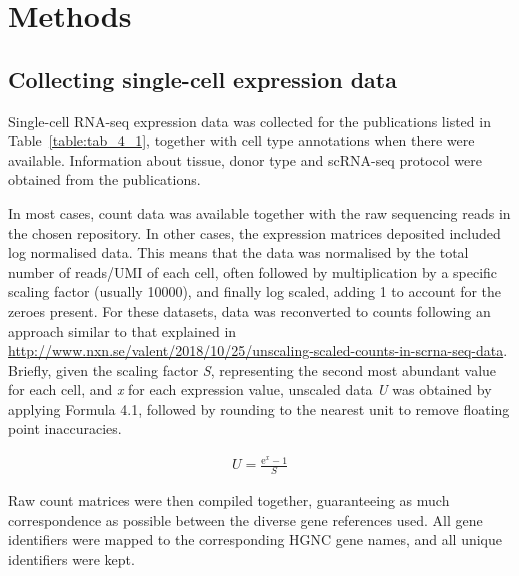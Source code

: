 




\section{Methods}
\label{section4.4}
\subsection{Collecting single-cell expression data}
\label{section4.4_datacol}
Single-cell RNA-seq expression data was collected for the publications listed in Table~\ref{table:tab_4_1}, together with cell type annotations when there were available. Information about tissue, donor type and scRNA-seq protocol were obtained from the publications.

In most cases, count data was available together with the raw sequencing reads in the chosen repository. In other cases, the expression matrices deposited included log normalised data. This means that the data was normalised by the total number of reads/UMI of each cell, often followed by multiplication by a specific scaling factor (usually 10000), and finally log scaled, adding 1 to account for the zeroes present. For these datasets, data was reconverted to counts following an approach similar to that explained in \url{http://www.nxn.se/valent/2018/10/25/unscaling-scaled-counts-in-scrna-seq-data}. Briefly, given the scaling factor \textit{S}, representing the second most abundant value for each cell, and \textit{x} for each expression value, unscaled data \textit{U} was obtained by applying Formula 4.1, followed by rounding to the nearest unit to remove floating point inaccuracies.

\begin{align}
U = \frac{\mathrm{e}^{x} - 1}{S}
\end{align}

Raw count matrices were then compiled together, guaranteeing as much correspondence as possible between the diverse gene references used. All gene identifiers were mapped to the corresponding HGNC gene names, and all unique identifiers were kept.


